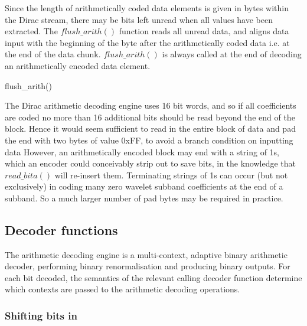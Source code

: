 Since the length of arithmetically coded data elements is given in bytes within the Dirac
stream, there may be bits left unread when all values have been extracted. The $flush\_arith()$
function reads all unread data, and aligns data input with the beginning of the byte 
after the arithmetically coded data i.e. at the end of the
data chunk. $flush\_arith()$ is always called at the end of decoding an arithmetically encoded
data element.

\begin{pseudo}{flush\_arith()}{}
\bsEND
\end{pseudo}

\begin{informative}
The Dirac arithmetic decoding engine uses 16 bit words, and so if all coefficients are
coded no more than 16 additional bits should be read beyond the end of the block. Hence it 
would seem sufficient to read in the entire block of data and pad the end with two bytes of value 0xFF,
to avoid a branch condition on inputting data
However, an arithmetically encoded block may end with a string of 1s, which an encoder could
conceivably strip out to save bits, in the knowledge that $read\_bita()$ will re-insert them. Terminating
strings of 1s can occur (but not exclusively) in coding many zero wavelet subband coefficients at the end
of a subband. So a much larger number of pad bytes may be required in practice.
\end{informative}

\begin{comment}
May need to add in an arbitrary number of such bytes in order to support early termination.
\end{comment}

\subsection{Decoder functions}
\label{extractarith}
The arithmetic decoding engine is a multi-context, adaptive binary
arithmetic decoder, performing binary renormalisation and producing
binary outputs. For each bit decoded, the semantics of the relevant
calling decoder function determine which contexts are passed to the
arithmetic decoding operations.

\subsubsection{Shifting bits in}

